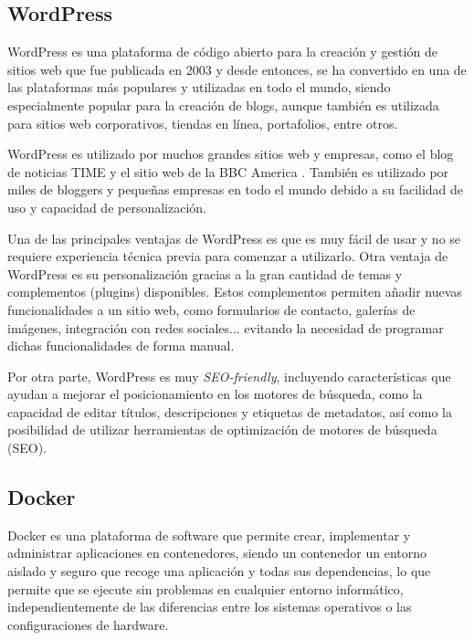             
        \subsection{WordPress}
            
            WordPress \cite{wordpress} es una plataforma de código abierto para la creación y gestión de sitios web que fue publicada en 2003 y desde entonces, se ha convertido en una de las plataformas más populares y utilizadas en todo el mundo, siendo especialmente popular para la creación de blogs, aunque también es utilizada para sitios web corporativos, tiendas en línea, portafolios, entre otros. 
            
            WordPress es utilizado por muchos grandes sitios web y empresas, como el blog de noticias TIME \cite{time-web} y el sitio web de la BBC America \cite{bbc-america-web}. También es utilizado por miles de bloggers y pequeñas empresas en todo el mundo debido a su facilidad de uso y capacidad de personalización.

            Una de las principales ventajas de WordPress es que es muy fácil de usar y no se requiere experiencia técnica previa para comenzar a utilizarlo. Otra ventaja de WordPress es su personalización gracias a la gran cantidad de temas y complementos (plugins) disponibles. Estos complementos permiten añadir nuevas funcionalidades a un sitio web, como formularios de contacto, galerías de imágenes, integración con redes sociales... evitando la necesidad de programar dichas funcionalidades de forma manual.
            
            Por otra parte, WordPress es muy \textit{SEO-friendly}, incluyendo características que ayudan a mejorar el posicionamiento en los motores de búsqueda, como la capacidad de editar títulos, descripciones y etiquetas de metadatos, así como la posibilidad de utilizar herramientas de optimización de motores de búsqueda (SEO).
            
            \newpage

            
        \subsection{Docker}
            \label{sec:docker}
        
            Docker es una plataforma de software que permite crear, implementar y administrar aplicaciones en contenedores, siendo un contenedor un entorno aislado y seguro que recoge una aplicación y todas sus dependencias, lo que permite que se ejecute sin problemas en cualquier entorno informático, independientemente de las diferencias entre los sistemas operativos o las configuraciones de hardware.
            
